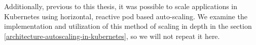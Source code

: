 Additionally, previous to this thesis, it was possible to scale applications in
Kubernetes using horizontal, reactive pod based auto-scaling. We examine the implementation
and utilization of this method of scaling in depth in the section
\ref{architecture-autoscaling-in-kubernetes}, so we will not repeat it here.
